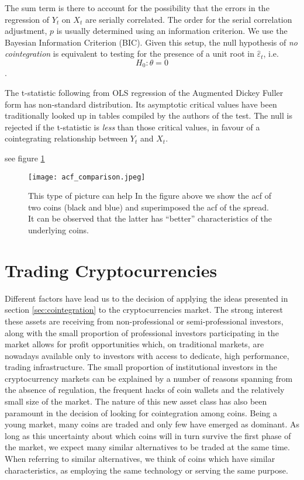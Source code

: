 \documentclass[a4paper,11pt]{article}
\theoremstyle{remark}
\theoremstyle{plain}
\newcommand\ab[1]{{\color{blue} #1 }}
\begin{document}
The sum term is there to account for the possibility that the errors in the regression of $Y_{t}$ on $X_{t}$ are serially correlated. The order for the serial correlation adjustment, $p$ is usually determined using an information criterion. We use the Bayesian Information Criterion (BIC). Given this setup, the null hypothesis of \textit{no cointegration} is equivalent to testing for the presence of a unit root in $\hat{\varepsilon}_{t}$, i.e. \[H_{0}: \theta = 0\].

The t-statistic following from OLS regression of the Augmented Dickey Fuller form has non-standard distribution. Its asymptotic critical values have been traditionally looked up in tables compiled by the authors of the test. The null is rejected if the t-statistic is \textit{less} than those critical values, in favour of a cointegrating relationship between $Y_{t}$ and $X_{t}$.

\newpagesee

see figure \ref{f:acf}

\begin{figure}
\centering
\texttt{[image: acf\_comparison.jpeg]}
\caption{\ab{This type of picture can help}In the figure above we show the acf of two coins (black and blue) and superimposed the acf of the spread. It can be observed that the latter has ``better'' characteristics of the underlying coins.} 
\label{f:acf}
\end{figure}

\section{Trading Cryptocurrencies}
\label{sec:cryptos}

Different factors have lead us to the decision of applying the ideas presented in section \ref{sec:cointegration} to the cryptocurrencies market. The strong interest these assets are receiving from non-professional or semi-professional investors, along with the small proportion of professional investors participating in the market allows for profit opportunities which, on traditional markets, are nowadays available only to investors with access to dedicate, high performance, trading infrastructure. The small proportion of institutional investors in the cryptocurrency markets can be explained by a number of reasons spanning from the absence of regulation, the frequent hacks of coin wallets and the relatively small size of the market. The nature of this new asset class has also been paramount in the decision of looking for cointegration among coins. Being a young market, many coins are traded and only few have emerged as dominant. As long as this uncertainty about which coins will in turn survive the first phase of the market, we expect many similar alternatives to be traded at the same time. When referring to similar alternatives, we think of coins which have similar characteristics, as employing the same technology or serving the same purpose.
\end{document}
